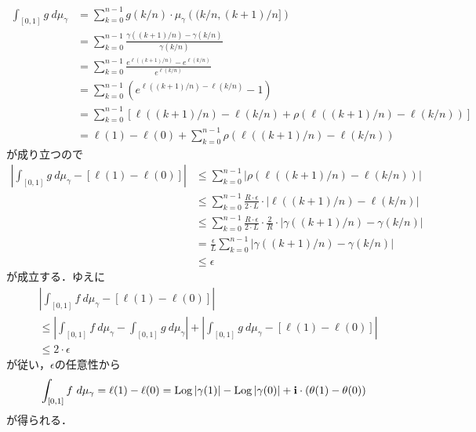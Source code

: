 \begin{sketch}
\begin{description}
\begin{align}
					\int_{[0,1]} g\ d\mu_{\gamma}
					&= \sum_{k=0}^{n-1} g(k/n) \cdot \mu_{\gamma}\left((k/n,(k+1)/n]\right) \\
					&= \sum_{k=0}^{n-1} \frac{\gamma((k+1)/n) - \gamma(k/n)}{\gamma(k/n)} \\
					&= \sum_{k=0}^{n-1} \frac{e^{\ell((k+1)/n)} - e^{\ell(k/n)}}{e^{\ell(k/n)}} \\
					&= \sum_{k=0}^{n-1} \left(e^{\ell((k+1)/n) - \ell(k/n)} - 1\right) \\
					&= \sum_{k=0}^{n-1} \left[\ell((k+1)/n) - \ell(k/n) + \rho\left(\ell((k+1)/n) - \ell(k/n)\right)\right] \\
					&= \ell(1) - \ell(0) + \sum_{k=0}^{n-1} \rho\left(\ell((k+1)/n) - \ell(k/n)\right)
				\end{align}
				が成り立つので
				\begin{align}
					\left|\int_{[0,1]} g\ d\mu_{\gamma} - [\ell(1) - \ell(0)]\right|
					&\leq \sum_{k=0}^{n-1} \left|\rho\left(\ell((k+1)/n) - \ell(k/n)\right)\right| \\
					&\leq \sum_{k=0}^{n-1} \frac{R \cdot \epsilon}{2 \cdot L} \cdot |\ell((k+1)/n) - \ell(k/n)| \\
					&\leq \sum_{k=0}^{n-1} \frac{R \cdot \epsilon}{2 \cdot L} \cdot \frac{2}{R} \cdot |\gamma((k+1)/n) - \gamma(k/n)| \\
					&= \frac{\epsilon}{L} \sum_{k=0}^{n-1} |\gamma((k+1)/n) - \gamma(k/n)| \\
					&\leq \epsilon
				\end{align}
				が成立する．ゆえに
				\begin{align}
					&\left|\int_{[0,1]} f\ d\mu_{\gamma} - [\ell(1) - \ell(0)]\right| \\
					&\leq \left|\int_{[0,1]} f\ d\mu_{\gamma} - \int_{[0,1]} g\ d\mu_{\gamma}\right|
					+ \left|\int_{[0,1]} g\ d\mu_{\gamma} - [\ell(1) - \ell(0)]\right| \\
					&\leq 2 \cdot \epsilon
				\end{align}
				が従い，$\epsilon$の任意性から
				\begin{align}
					\int_{[0,1]} f\ d\mu_{\gamma} = \ell(1) - \ell(0)
					= \operatorname{Log}{|\gamma(1)|} - \operatorname{Log}{|\gamma(0)|} + \mathbf{i} \cdot \left(\theta(1) - \theta(0)\right)
				\end{align}
				が得られる．
				

\end{description}
\end{sketch}
